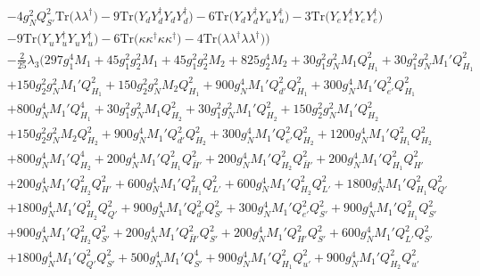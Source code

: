 {\begin{align}
 &-4 g_{N}^{2} Q_{S'}^{2} \mbox{Tr}\Big({\lambda  \lambda^{\dagger}}\Big) -9 \mbox{Tr}\Big({Y_d  Y_{d}^{\dagger}  Y_d  Y_{d}^{\dagger}}\Big) -6 \mbox{Tr}\Big({Y_d  Y_{d}^{\dagger}  Y_u  Y_{u}^{\dagger}}\Big) -3 \mbox{Tr}\Big({Y_e  Y_{e}^{\dagger}  Y_e  Y_{e}^{\dagger}}\Big) \nonumber \\ 
 &-9 \mbox{Tr}\Big({Y_u  Y_{u}^{\dagger}  Y_u  Y_{u}^{\dagger}}\Big) -6 \mbox{Tr}\Big({\kappa  \kappa^{\dagger}  \kappa  \kappa^{\dagger}}\Big) -4 \mbox{Tr}\Big({\lambda  \lambda^{\dagger}  \lambda  \lambda^{\dagger}}\Big) \Big)\nonumber \\ 
 &-\frac{2}{25} \lambda_3 \Big(297 g_{1}^{4} M_1 +45 g_{1}^{2} g_{2}^{2} M_1 +45 g_{1}^{2} g_{2}^{2} M_2 +825 g_{2}^{4} M_2 +30 g_{1}^{2} g_{N}^{2} M_1 Q_{H_1}^{2} +30 g_{1}^{2} g_{N}^{2} M_1' Q_{H_1}^{2} \nonumber \\ 
 &+150 g_{2}^{2} g_{N}^{2} M_1' Q_{H_1}^{2} +150 g_{2}^{2} g_{N}^{2} M_2 Q_{H_1}^{2} +900 g_{N}^{4} M_1' Q_{d'}^{2} Q_{H_1}^{2} +300 g_{N}^{4} M_1' Q_{e'}^{2} Q_{H_1}^{2} \nonumber \\ 
 &+800 g_{N}^{4} M_1' Q_{H_1}^{4} +30 g_{1}^{2} g_{N}^{2} M_1 Q_{H_2}^{2} +30 g_{1}^{2} g_{N}^{2} M_1' Q_{H_2}^{2} +150 g_{2}^{2} g_{N}^{2} M_1' Q_{H_2}^{2} \nonumber \\ 
 &+150 g_{2}^{2} g_{N}^{2} M_2 Q_{H_2}^{2} +900 g_{N}^{4} M_1' Q_{d'}^{2} Q_{H_2}^{2} +300 g_{N}^{4} M_1' Q_{e'}^{2} Q_{H_2}^{2} +1200 g_{N}^{4} M_1' Q_{H_1}^{2} Q_{H_2}^{2} \nonumber \\ 
 &+800 g_{N}^{4} M_1' Q_{H_2}^{4} +200 g_{N}^{4} M_1' Q_{H_1}^{2} Q_{\bar{H}'}^{2} +200 g_{N}^{4} M_1' Q_{H_2}^{2} Q_{\bar{H}'}^{2} +200 g_{N}^{4} M_1' Q_{H_1}^{2} Q_{H'}^{2} \nonumber \\ 
 &+200 g_{N}^{4} M_1' Q_{H_2}^{2} Q_{H'}^{2} +600 g_{N}^{4} M_1' Q_{H_1}^{2} Q_{L'}^{2} +600 g_{N}^{4} M_1' Q_{H_2}^{2} Q_{L'}^{2} +1800 g_{N}^{4} M_1' Q_{H_1}^{2} Q_{Q'}^{2} \nonumber \\ 
 &+1800 g_{N}^{4} M_1' Q_{H_2}^{2} Q_{Q'}^{2} +900 g_{N}^{4} M_1' Q_{d'}^{2} Q_{S'}^{2} +300 g_{N}^{4} M_1' Q_{e'}^{2} Q_{S'}^{2} +900 g_{N}^{4} M_1' Q_{H_1}^{2} Q_{S'}^{2} \nonumber \\ 
 &+900 g_{N}^{4} M_1' Q_{H_2}^{2} Q_{S'}^{2} +200 g_{N}^{4} M_1' Q_{\bar{H}'}^{2} Q_{S'}^{2} +200 g_{N}^{4} M_1' Q_{H'}^{2} Q_{S'}^{2} +600 g_{N}^{4} M_1' Q_{L'}^{2} Q_{S'}^{2} \nonumber \\ 
 &+1800 g_{N}^{4} M_1' Q_{Q'}^{2} Q_{S'}^{2} +500 g_{N}^{4} M_1' Q_{S'}^{4} +900 g_{N}^{4} M_1' Q_{H_1}^{2} Q_{u'}^{2} +900 g_{N}^{4} M_1' Q_{H_2}^{2} Q_{u'}^{2} \nonumber \\ 

\end{align}}

